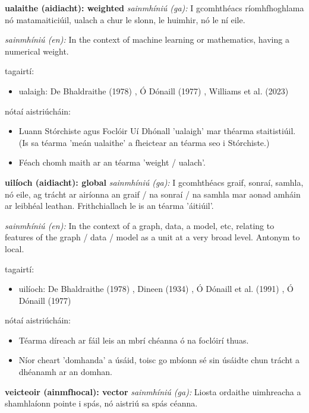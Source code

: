 \documentclass{article}
\begin{document}
\textbf{ualaithe (aidiacht): weighted}
\textit{sainmhíniú (ga):} I gcomhthéacs ríomhfhoghlama nó matamaiticiúil, ualach a chur le slonn, le huimhir, nó le ní eile.

\textit{sainmhíniú (en):} In the context of machine learning or mathematics, having a numerical weight.

tagairtí:
\begin{itemize}
	\item ualaigh: De Bhaldraithe (1978) \cite{de-bhaldraithe}, Ó Dónaill (1977) \cite{odonaill}, Williams et al. (2023) \cite{storchiste}
\end{itemize}

nótaí aistriúcháin:
\begin{itemize}
	\item Luann Stórchiste agus Foclóir Uí Dhónall 'ualaigh' mar théarma staitistiúil. (Is sa téarma 'meán ualaithe' a fheictear an téarma seo i Stórchiste.)
	\item Féach chomh maith ar an téarma 'weight / ualach'.
\end{itemize}


\textbf{uilíoch (aidiacht): global}
\textit{sainmhíniú (ga):} I gcomhthéacs graif, sonraí, samhla, nó eile, ag trácht ar airíonna an graif / na sonraí / na samhla mar aonad amháin ar leibhéal leathan. Frithchiallach le is an téarma 'áitiúil'.

\textit{sainmhíniú (en):} In the context of a graph, data, a model, etc, relating to features of the graph / data / model as a unit at a very broad level. Antonym to local.

tagairtí:
\begin{itemize}
	\item uilíoch: De Bhaldraithe (1978) \cite{de-bhaldraithe}, Dineen (1934) \cite{dineen}, Ó Dónaill et al. (1991) \cite{focloir-beag}, Ó Dónaill (1977) \cite{odonaill}
\end{itemize}

nótaí aistriúcháin:
\begin{itemize}
	\item Téarma díreach ar fáil leis an mbrí chéanna ó na foclóirí thuas.
	\item Níor cheart 'domhanda' a úsáid, toisc go mbíonn sé sin úsáidte chun trácht a dhéanamh ar an domhan.
\end{itemize}


\textbf{veicteoir (ainmfhocal): vector}
\textit{sainmhíniú (ga):} Liosta ordaithe uimhreacha a shamhlaíonn pointe i spás, nó aistriú sa spás céanna.
\end{document}
